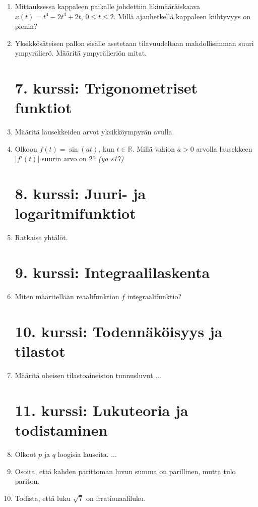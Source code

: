 \documentclass[12pt,fleqn]{article}
\begin{document}
\begin{enumerate}[label=\textbf{\arabic*.}]
\item Mittauksessa kappaleen paikalle johdettiin likimääräiskaava \(x(t)=t^4-2t^3+2t\), \(0\leq t \leq 2\). Millä ajanhetkellä kappaleen kiihtyvyys on pienin?

\item Yksikkösäteisen pallon sisälle asetetaan tilavuudeltaan mahdollisimman suuri ympyrälierö. Määritä ympyrälieriön mitat.

\newpage
\section*{7. kurssi: Trigonometriset funktiot}
\item Määritä lausekkeiden arvot yksikköympyrän avulla.

\item Olkoon \(f(t)=\sin(at)\), kun \(t\in \mathbb{R}\). Millä vakion \(a>0\) arvolla lausekkeen \(|f'(t)|\) suurin arvo on 2? \emph{(yo s17)}

\newpage
\section*{8. kurssi: Juuri- ja logaritmifunktiot}
\item Ratkaise yhtälöt.


\newpage
\section*{9. kurssi: Integraalilaskenta}
\item Miten määritellään reaalifunktion \(f\) integraalifunktio?

\newpage
\section*{10. kurssi: Todennäköisyys ja tilastot}
\item Määritä oheisen tilastoaineiston tunnusluvut ...

\newpage
\section*{11. kurssi: Lukuteoria ja todistaminen}
\item Olkoot \(p\) ja \(q\) loogisia lauseita. ...

\item Osoita, että kahden parittoman luvun summa on parillinen, mutta tulo pariton.

\item Todista, että luku \(\sqrt{7}\) on irrationaaliluku.


\end{enumerate}
\end{document}
